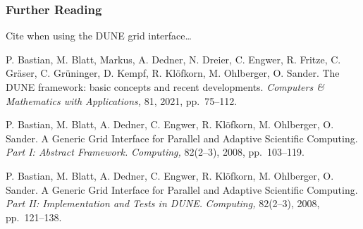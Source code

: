 \documentclass[aspectratio=169,11pt]{beamer}
\theoremstyle{definition}
\begin{document}
\begin{frame} \frametitle<presentation>{Further Reading}
    \small
    Cite when using the DUNE grid interface\ldots
    \begingroup
    \renewcommand{\section}[2]{}%
    \begin{thebibliography}{}

      P. Bastian, M. Blatt, Markus, A. Dedner, N. Dreier, C. Engwer, R. Fritze, C. Gr{\"a}ser, C. Gr{\"u}ninger, D. Kempf, R. Kl{\"o}fkorn, M. Ohlberger, O. Sander.
      \newblock The DUNE framework: basic concepts and recent developments.
      \newblock \emph{Computers \& Mathematics with Applications,} 81, 2021, pp.~75--112.

P. Bastian, M. Blatt, A. Dedner, C. Engwer, R. Klöfkorn, M. Ohlberger,
O. Sander.
\newblock A Generic Grid Interface for Parallel and Adaptive
Scientific Computing.
\emph{Part I: Abstract Framework.}
\newblock \emph{Computing,} 82(2--3), 2008, pp.~103--119.

P. Bastian, M. Blatt, A. Dedner, C. Engwer, R. Klöfkorn, M. Ohlberger,
O. Sander.
\newblock A Generic Grid Interface for Parallel and Adaptive
Scientific Computing.
\emph{Part II: Implementation and Tests in DUNE.}
\newblock \emph{Computing,} 82(2--3), 2008, pp.~121--138.

\end{thebibliography}
    \endgroup
\end{frame}
\end{document}

